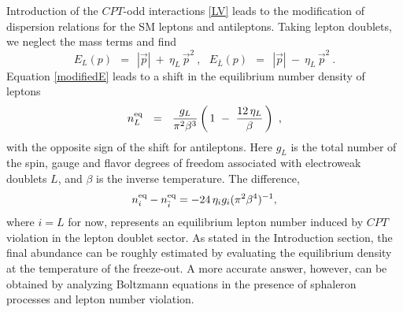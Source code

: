 \documentclass[12pt]{revtex4}
\newcommand{\eq}{{\rm eq}}
\begin{document}
Introduction of the $CPT$-odd interactions \eqref{LV} leads to the modification of 
dispersion relations for the SM leptons and antileptons. Taking lepton doublets, we neglect
the mass terms and find 
\begin{equation}
	E_L(p) ~~=~~ |\vec{p}| ~+~  \eta_L\, \vec{p}^2~, ~~~ 
E_{\bar L}(p) ~~=~~ |\vec{p}| ~-~  \eta_L\, \vec{p}^2~.
\label{modifiedE}
\end{equation}
Equation \eqref{modifiedE} leads to a shift in the equilibrium number density of leptons
\[
        n_L^\eq ~~=~~ \frac{g_L}{\pi^2 \beta^3}
			\left (\, 1 ~-~ \frac{12\,\eta_L}{\beta} \,\right)~,
\]
with the opposite sign of the shift for antileptons. Here $g_L$ is the total number of the spin, 
gauge and flavor
 degrees 
of freedom associated with electroweak doublets $L$, and 
$\beta$ is the inverse temperature. The difference,
\begin{equation}
\label{difference}
n_i^\eq - n_{\bar i}^\eq =-24\,\eta_i g_i(\pi^2 \beta^4)^{-1}, 
\end{equation}
where $ i = L $ for now,
represents an equilibrium lepton number 
induced by $CPT$ violation in the lepton doublet sector. 
As stated in the Introduction section, the final abundance can be roughly
estimated by evaluating the equilibrium density at the temperature
of the freeze-out.
A more accurate answer, however, can be obtained by analyzing Boltzmann equations in the 
presence of sphaleron processes and lepton number violation.
\end{document}
